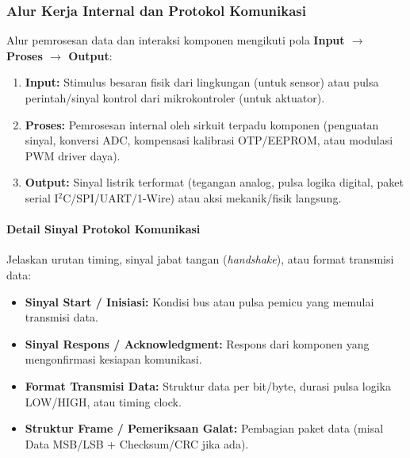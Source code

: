 \subsubsection{Alur Kerja Internal dan Protokol Komunikasi}
Alur pemrosesan data dan interaksi komponen mengikuti pola \textbf{Input $\rightarrow$ Proses $\rightarrow$ Output}:
\begin{enumerate}
	\item \textbf{Input:} Stimulus besaran fisik dari lingkungan (untuk sensor) atau pulsa perintah/sinyal kontrol dari mikrokontroler (untuk aktuator).
	\item \textbf{Proses:} Pemrosesan internal oleh sirkuit terpadu komponen (penguatan sinyal, konversi ADC, kompensasi kalibrasi OTP/EEPROM, atau modulasi PWM driver daya).
	\item \textbf{Output:} Sinyal listrik terformat (tegangan analog, pulsa logika digital, paket serial I$^2$C/SPI/UART/1-Wire) atau aksi mekanik/fisik langsung.
\end{enumerate}

\paragraph{Detail Sinyal Protokol Komunikasi}
Jelaskan urutan timing, sinyal jabat tangan (\textit{handshake}), atau format transmisi data:
\begin{itemize}
	\item \textbf{Sinyal Start / Inisiasi:} Kondisi bus atau pulsa pemicu yang memulai transmisi data.
	\item \textbf{Sinyal Respons / Acknowledgment:} Respons dari komponen yang mengonfirmasi kesiapan komunikasi.
	\item \textbf{Format Transmisi Data:} Struktur data per bit/byte, durasi pulsa logika LOW/HIGH, atau timing clock.
	\item \textbf{Struktur Frame / Pemeriksaan Galat:} Pembagian paket data (misal Data MSB/LSB + Checksum/CRC jika ada).
\end{itemize}


